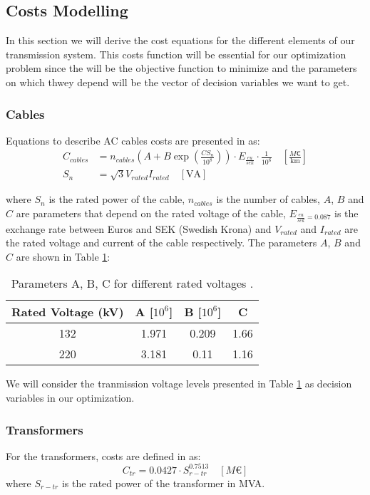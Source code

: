\documentclass[a4paper,11pt, titlepage, twoside]{article}
\begin{document}
\subsection{Costs Modelling}

In this section we will derive the cost equations for the different elements of our transmission system. This costs function will be essential for our optimization problem since
the will be the objective function to minimize and the parameters on which thwey depend will be the vector of decision variables we want to get.
\subsubsection{Cables}

Equations to describe AC cables costs are presented in \cite{chalmers} as:
\begin{align}
    C_{cables} &= n_{cables} (A + B \exp(\frac{CS_n}{10^8})) \cdot E_{\frac{eu}{sek}} \cdot \frac{1}{10^6} \quad \left[\frac{M\euro}{\text{km}}\right] \\
    S_n &= \sqrt{3}V_{rated}I_{rated} \quad \left[\text{VA}\right]
\end{align}

where $S_n$ is the rated power of the cable, $n_{cables}$ is the number of cables, $A$, $B$ and $C$ are parameters that depend on the rated voltage of the cable, $E_{\frac{eu}{sek}=0.087}$ is the exchange rate between Euros and SEK (Swedish Krona) and $V_{rated}$ and $I_{rated}$ are the rated voltage and current of the cable respectively.
The parameters $A$, $B$ and $C$ are shown in Table \ref{tab:parameterscab}:
\begin{table}[H]
    \centering
    \begin{tabular}{c|c|c|c}
    \hline
    \textbf{Rated Voltage (kV)} & \textbf{A [$10^6$]} & \textbf{B [$10^6$]} & \textbf{C} \\
    \hline
    132 & 1.971 & 0.209 & 1.66 \\
    220 & 3.181 & 0.11 & 1.16 \\
    \hline
    \end{tabular}
    \caption{Parameters A, B, C for different rated voltages \cite{chalmers}.}
    \label{tab:parameterscab}
    \end{table}
We will consider the tranmission voltage levels presented in Table \ref{tab:parameterscab} as decision variables in our optimization.


\subsubsection{Transformers}
For the transformers, costs are defined in \cite{costraf} as:
\begin{equation}
    C_{tr}= 0.0427 \cdot S_{r-tr}^{0.7513} \quad \left[M\euro\right]
\end{equation}
where $S_{r-tr}$ is the rated power of the transformer in MVA.
\end{document}
